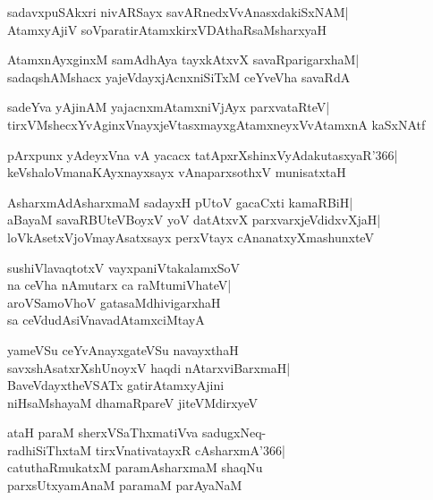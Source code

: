\documentclass[twoside,12pt,openright]{book}
\newcounter{shloka}[chapter]
\begin{document}
\begin{shloka}%
sadavxpuSAkxri nivARSayx savARnedxVvAnasxdakiSxNAM|\\
AtamxyAjiV soVparatirAtamxkirxVDAthaRsaMsharxyaH
\end{shloka}

\begin{shloka}%
AtamxnAyxginxM samAdhAya tayxkAtxvX savaRparigarxhaM|\\
sadaqshAMshacx yajeVdayxjAcnxniSiTxM ceYveVha savaRdA
\end{shloka}

\begin{shloka}%
sadeYva yAjinAM yajacnxmAtamxniVjAyx parxvataRteV|\\
tirxVMshecxYvAginxVnayxjeVtasxmayxgAtamxneyxVvAtamxnA kaSxNAtf
\end{shloka}

\begin{shloka}%
pArxpunx yAdeyxVna vA yacacx tatApxrXshinxVyAdakutasxyaR\char'366|\\
keVshaloVmanaKAyxnayxsayx vAnaparxsothxV munisatxtaH
\end{shloka}

\begin{shloka}%
AsharxmAdAsharxmaM sadayxH pUtoV gacaCxti kamaRBiH|\\
aBayaM savaRBUteVBoyxV yoV datAtxvX parxvarxjeVdidxvXjaH|\\
loVkAsetxVjoVmayAsatxsayx perxVtayx cAnanatxyXmashunxteV
\end{shloka}

\begin{shloka}%
sushiVlavaqtotxV vayxpaniVtakalamxSoV\\
na ceVha nAmutarx ca raMtumiVhateV|\\
aroVSamoVhoV gatasaMdhivigarxhaH\\
sa ceVdudAsiVnavadAtamxciMtayA
\end{shloka}

\begin{shloka}%
yameVSu ceYvAnayxgateVSu navayxthaH\\
savxshAsatxrXshUnoyxV haqdi nAtarxviBarxmaH|\\
BaveVdayxtheVSATx gatirAtamxyAjini\\
niHsaMshayaM dhamaRpareV jiteVMdirxyeV
\end{shloka}

\begin{shloka}%
ataH paraM sherxVSaThxmatiVva sadugxNeq-\\
radhiSiThxtaM  tirxVnativatayxR cAsharxmA\char'366|\\
catuthaRmukatxM paramAsharxmaM shaqNu\\
parxsUtxyamAnaM paramaM parAyaNaM
\end{shloka}
\end{document}
